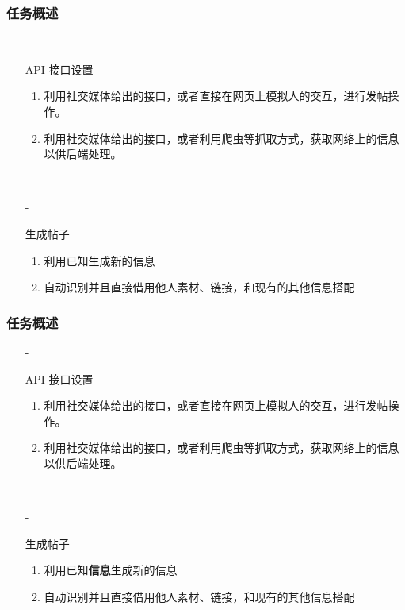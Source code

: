 \documentclass[10pt]{beamer}
\begin{document}
    \begin{frame}
        \frametitle{任务概述}
        \begin{itemize}
            \item[-]{
                API 接口设置
                \begin{enumerate}
                    \item 利用社交媒体给出的接口，或者直接在网页上模拟人的交互，进行发帖操作。
                    \item 利用社交媒体给出的接口，或者利用爬虫等抓取方式，获取网络上的信息以供后端处理。
                \end{enumerate}
                \hspace*{\fill}\\
                }
            \item[-]{
                生成帖子
                \begin{enumerate}
                    \item 利用已知生成新的信息
                    \item 自动识别并且直接借用他人素材、链接，和现有的其他信息搭配
                \end{enumerate}
                } 
        \end{itemize}
    \end{frame}

    \begin{frame}
        \frametitle{任务概述}
        \begin{itemize}
            \item[-]{
                API 接口设置
                \begin{enumerate}
                    \item 利用社交媒体给出的接口，或者直接在网页上模拟人的交互，进行发帖操作。
                    \item 利用社交媒体给出的接口，或者利用爬虫等抓取方式，获取网络上的信息以供后端处理。
                \end{enumerate}
                \hspace*{\fill}\\
                }
            \item[-]{
                生成帖子
                \begin{enumerate}
                    \item 利用已知\textbf{信息}生成新的信息
                    \item 自动识别并且直接借用他人素材、链接，和现有的其他信息搭配
                \end{enumerate}
                } 
        \end{itemize}
    \end{frame}
\end{document}

